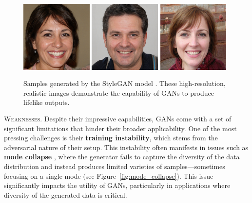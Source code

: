 \begin{figure}[ht]
    \centering
    \includegraphics[width=0.32\textwidth]{introduction/figures/stylegan_example_1.jpeg}
    \includegraphics[width=0.32\textwidth]{introduction/figures/stylegan_example_2.jpeg}
    \includegraphics[width=0.32\textwidth]{introduction/figures/stylegan_example_3.jpeg}
    \caption{Samples generated by the StyleGAN model \cite{karras2019stylegan}. These high-resolution, realistic images demonstrate the capability of GANs to produce lifelike outputs.}
    \label{fig:stylegan_samples}
\end{figure}


\textsc{Weaknesses.} Despite their impressive capabilities, GANs come with a set of significant limitations that hinder their broader applicability. One of the most pressing challenges is their \textbf{training instability}, which stems from the adversarial nature of their setup. This instability often manifests in issues such as \textbf{mode collapse} \citep{arjovsky2017wasserstein}, where the generator fails to capture the diversity of the data distribution and instead produces limited varieties of samples—sometimes focusing on a single mode (see Figure~\ref{fig:mode_collapse}). This issue significantly impacts the utility of GANs, particularly in applications where diversity of the generated data is critical.

